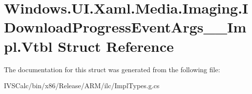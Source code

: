 \hypertarget{struct_windows_1_1_u_i_1_1_xaml_1_1_media_1_1_imaging_1_1_i_download_progress_event_args_____impl_1_1_vtbl}{}\section{Windows.\+U\+I.\+Xaml.\+Media.\+Imaging.\+I\+Download\+Progress\+Event\+Args\+\_\+\+\_\+\+Impl.\+Vtbl Struct Reference}
\label{struct_windows_1_1_u_i_1_1_xaml_1_1_media_1_1_imaging_1_1_i_download_progress_event_args_____impl_1_1_vtbl}


The documentation for this struct was generated from the following file\+:\begin{DoxyCompactItemize}
\item 
I\+V\+S\+Calc/bin/x86/\+Release/\+A\+R\+M/ilc/Impl\+Types.\+g.\+cs\end{DoxyCompactItemize}
